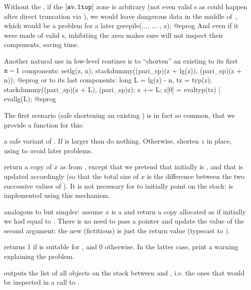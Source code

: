 Without the , if the $[{\tt av}, {\tt ltop}]$ zone is
arbitrary (not even valid s as could happen after direct
truncation via ), we would leave dangerous data in the middle
of~, which would be a problem for a later
\bprog
  gerepile(..., ... , z);
@eprog\noindent
And even if it were made of valid s, inhibiting the area makes sure
 will not inspect their components, saving time.

Another natural use in low-level routines is to ``shorten'' an existing
  to its first ${\tt n}-1$ components:
\bprog
  setlg(z, n);
  stackdummy((pari_sp)(z + lg(z)), (pari_sp)(z + n));
@eprog\noindent
or to its last  components:
\bprog
  long L = lg(z) - n, tz = typ(z);
  stackdummy((pari_sp)(z + L), (pari_sp)z);
  z += L; z[0] = evaltyp(tz) | evallg(L);
@eprog

The first scenario (safe shortening an existing ) is in fact so
common, that we provide a function for this:

 a safe variant of . If
 is larger than  do nothing. Otherwise, shorten $z$ in
place, using  to avoid later  problems.

 return a copy of $x$ as from ,
except that we pretend that initially  is , and that 
is updated accordingly (so that the total size of $x$ is the difference between the
two successive values of ). It is not necessary for 
to initially point on the stack:  is implemented using this mechanism.

 analogous to  but simpler:
assume $x$ is a  and return a copy allocated as if initially we had
 equal to . There is no need to pass a pointer and update the value
of the second argument: the new (fictitious)  is just the return value
(typecast to ).


 returns 1 if  is suitable for
, and 0 otherwise. In the latter case, print a warning
explaining the problem.

 outputs the list of all objects on the
stack between  and , i.e. the ones that would be inspected
in a call to .

